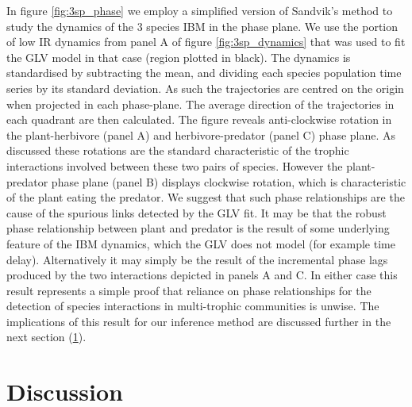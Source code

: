 In figure \ref{fig:3sp_phase} we employ a simplified version of Sandvik's method \cite{sandvik2004using} to study the dynamics of the 3 species IBM in the phase plane. We use the portion of low IR dynamics from panel A of figure \ref{fig:3sp_dynamics} that was used to fit the GLV model in that case (region plotted in black). The dynamics is standardised by subtracting the mean, and dividing each species population time series by its standard deviation. As such the trajectories are centred on the origin when projected in each phase-plane. The average direction of the trajectories in each quadrant are then calculated. The figure reveals anti-clockwise rotation in the plant-herbivore (panel A) and herbivore-predator (panel C) phase plane. As discussed these rotations are the standard characteristic of the trophic interactions involved between these two pairs of species. However the plant-predator phase plane (panel B) displays clockwise rotation, which is characteristic of the plant eating the predator. We suggest that such phase relationships are the cause of the spurious links detected by the GLV fit. It may be that the robust phase relationship between plant and predator is the result of some underlying feature of the IBM dynamics, which the GLV does not model (for example time delay). Alternatively it may simply be the result of the incremental phase lags produced by the two interactions depicted in panels A and C. In either case this result represents a simple proof that reliance on phase relationships for the detection of species interactions in multi-trophic communities is unwise. The implications of this result for our inference method are discussed further in the next section (\ref{sec:si_discussion}).




\section{Discussion}
\label{sec:si_discussion}

